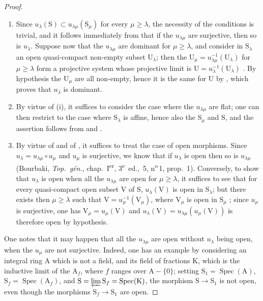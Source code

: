 \begin{proof}
\begin{enumerate}[label=(\roman*)]
  \item Since $u_\lambda(\mathrm{S})\subset u_{\lambda\mu}(\mathrm{S}_\mu)$ for every $\mu\geqslant\lambda$, the necessity of the conditions is trivial, and it follows immediately from  that if the $u_{\lambda\mu}$ are surjective, then so is $u_\lambda$.
Suppose now that the $u_{\lambda\mu}$ are dominant for $\mu\geqslant\lambda$, and consider in $\mathrm{S}_\lambda$ an open quasi-compact non-empty subset $\mathrm{U}_\lambda$; then the $\mathrm{U}_\mu=u_{\lambda\mu}^{-1}(\mathrm{U}_\lambda)$ for $\mu\geqslant\lambda$ form a projective system whose projective limit is $\mathrm{U}=u_\lambda^{-1}(\mathrm{U}_\lambda)$ .
By hypothesis the $\mathrm{U}_\mu$ are all non-empty, hence it is the same for $\mathrm{U}$ by , which proves that $u_\lambda$ is dominant.

  \item By virtue of (i), it suffices to consider the case where the $u_{\lambda\mu}$ are flat; one can then restrict to the case where $\mathrm{S}_\lambda$ is affine, hence also the $\mathrm{S}_\mu$ and $\mathrm{S}$, and the assertion follows from  and .

  \item By virtue of  and of , it suffices to treat the case of open morphisms.
Since $u_\lambda=u_{\lambda\mu}\circ u_\mu$ and $u_\mu$ is surjective, we know that if $u_\lambda$ is open then so is $u_{\lambda\mu}$ (Bourbaki, \emph{Top.\ g\'{e}n.}, chap.~I\textsuperscript{er}, 3\textsuperscript{e}~ed., \textsection\,5, n\textsuperscript{o}\,1, prop.~1).
Conversely, to show that $u_\lambda$ is open when all the $u_{\lambda\mu}$ are open for $\mu\geqslant\lambda$, it suffices to see that for every quasi-compact open subset $\mathrm{V}$ of $\mathrm{S}$, $u_\lambda(\mathrm{V})$ is open in $\mathrm{S}_\lambda$; but there exists then $\mu\geqslant\lambda$ such that $\mathrm{V}=u_\mu^{-1}(\mathrm{V}_\mu)$, where $\mathrm{V}_\mu$ is open in $\mathrm{S}_\mu$ ; since $u_\mu$ is surjective, one has $\mathrm{V}_\mu=u_\mu(\mathrm{V})$ and $u_\lambda(\mathrm{V})=u_{\lambda\mu}(u_\mu(\mathrm{V}))$ is therefore open by hypothesis.
\end{enumerate}

One notes that it may happen that all the $u_{\lambda\mu}$ are open without $u_\lambda$ being open, when the $u_\mu$ are not surjective.
Indeed, one has an example by considering an integral ring $\mathrm{A}$ which is not a field, and its field of fractions $\mathrm{K}$, which is the inductive limit of the $\mathrm{A}_f$, where $f$ ranges over $\mathrm{A}-\{0\}$; setting $\mathrm{S}_1=\operatorname{Spec}(\mathrm{A})$, $\mathrm{S}_f=\operatorname{Spec}(\mathrm{A}_f)$, and $\mathrm{S}=\varprojlim\mathrm{S}_f=\operatorname{Spec}(\mathrm{K})$, the morphism $\mathrm{S}\to\mathrm{S}_1$ is not open, even though the morphisms $\mathrm{S}_f\to\mathrm{S}_1$ are open.
\end{proof}

